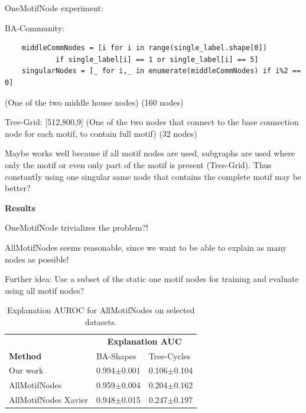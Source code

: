 OneMotifNode experiment:

BA-Community:
\begin{verbatim}
    middleCommNodes = [i for i in range(single_label.shape[0]) 
            if single_label[i] == 1 or single_label[i] == 5]
    singularNodes = [_ for i,_ in enumerate(middleCommNodes) if i%2 == 0]
\end{verbatim}
(One of the two middle house nodes) (160 nodes)

Tree-Grid:
[512,800,9]
(One of the two nodes that connect to the base connection node for each motif, to contain full motif) (32 nodes)

Maybe works well because if all motif nodes are used, subgraphs are used where only the motif or even only part of the motif is present (Tree-Grid). Thus constantly using one singular same node that contains the complete motif may be better?


\textbf{Results}

OneMotifNode trivializes the problem?!

AllMotifNodes seems reasonable, since we want to be able to explain as many nodes as possible!

Further idea: Use a subset of the static one motif nodes for training and evaluate using all motif nodes?

\begin{table}[ht]
    \centering
    \scriptsize
    \begin{tabularx}{0.6\textwidth}{l*{2}{X}}   %
    \toprule
    \textbf{} & \multicolumn{2}{c}{\textbf{Explanation AUC}} \\
    \cmidrule{2-3}
    \textbf{Method} & BA-Shapes & Tree-Cycles \\
    \midrule
    Our work & 0.994$\pm$0.001 & 0.106$\pm$0.104 \\
    \midrule
    AllMotifNodes & 0.959$\pm$0.004 & 0.204$\pm$0.162 \\
    \midrule
    AllMotifNodes Xavier & 0.948$\pm$0.015 & 0.247$\pm$0.197 \\
    \bottomrule
    \end{tabularx}
    \caption[Inductive performance using all motif nodes for training]{Explanation AUROC for AllMotifNodes on selected datasets.}
    \label{tab:allmotifnodes_selected}
\end{table}

